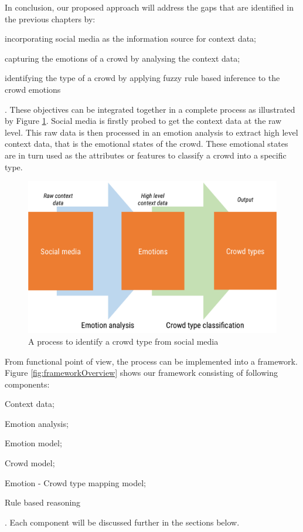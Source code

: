 In conclusion, our proposed approach will address the gaps that are identified in the previous chapters by: 
\begin{inparaenum}[i)]
\item incorporating social media as the information source for context data;
\item capturing the emotions of a crowd by analysing the context data;
\item identifying the type of a crowd by applying fuzzy rule based inference to the crowd emotions
\end{inparaenum}. These objectives can be integrated together in a complete process as illustrated by Figure \ref{fig:processOverview}. Social media is firstly probed to get the context data at the raw level. This raw data is then processed in an emotion analysis to extract high level context data, that is the emotional states of the crowd. These emotional states are in turn used as the attributes or features to classify a crowd into a specific type.

\begin{figure}[htbp!] 
\centering    
\includegraphics[width=1.0\textwidth]{ProcessOverview}
\caption{A process to identify a crowd type from social media}
\label{fig:processOverview}
\end{figure}

From functional point of view, the process can be implemented into a framework. Figure \ref{fig:frameworkOverview} shows our framework consisting of following components:
\begin{inparaenum}[i)]
\item Context data;
\item Emotion analysis;
\item Emotion model;
\item Crowd model;
\item Emotion - Crowd type mapping model;
\item Rule based reasoning
\end{inparaenum}. Each component will be discussed further in the sections below.

